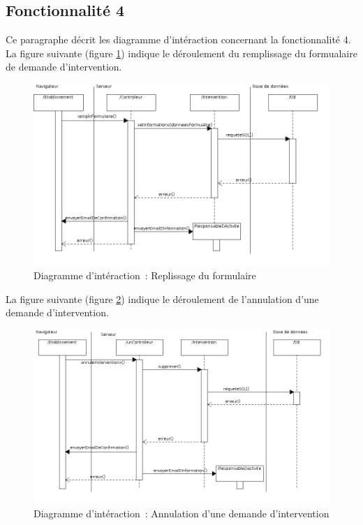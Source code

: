 \subsection{Fonctionnalité 4}
Ce paragraphe décrit les diagramme d'intéraction concernant la fonctionnalité 4. \\

La figure suivante (figure \ref{diagrammeInteraction5}) indique le déroulement du remplissage du formualaire de demande d'intervention.
\begin{figure}[H]
	\centering
	\includegraphics[scale=0.5]{../../lot2/DCP/images/diagrammesInteraction/05_diagrammeInteractionF4.png}
	\caption{Diagramme d'intéraction~: Replissage du formulaire}
	\label{diagrammeInteraction5}
\end{figure}


La figure suivante (figure \ref{diagrammeInteraction6}) indique le déroulement de l'annulation d'une demande d'intervention.
\begin{figure}[h]
	\centering
	\includegraphics[scale=0.5]{../../lot2/DCP/images/diagrammesInteraction/06_diagrammeInteractionF4.png}
	\caption{Diagramme d'intéraction~: Annulation d'une demande d'intervention}
	\label{diagrammeInteraction6}
\end{figure}

